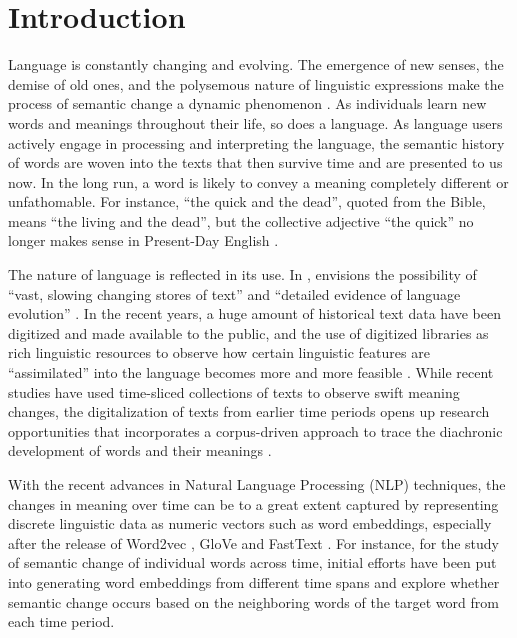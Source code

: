 

\chapter{Introduction}
Language is constantly changing and evolving. The emergence of new senses, the demise of old ones, and the polysemous nature of linguistic expressions make the process of semantic change a dynamic phenomenon \parencite{robertinvanhove2008}. As individuals learn new words and meanings throughout their life, so does a language. As language users actively engage in processing and interpreting the language, the semantic history of words are woven into the texts that then survive time and are presented to us now. In the long run, a word is likely to convey a meaning completely different or unfathomable. For instance, ``the quick and the dead'', quoted from the Bible, means ``the living and the dead'', but the collective adjective ``the quick'' no longer makes sense in Present-Day English \parencite[199]{semanticincrowley2010}.

The nature of language is reflected in its use. In \citeyear{sinclair1982reflections}, \citeauthor{sinclair1982reflections} envisions the possibility of ``vast, slowing changing stores of text'' and ``detailed evidence of language evolution'' . In the recent years, a huge amount of historical text data have been digitized and made available to the public, and the use of digitized libraries as rich linguistic resources to observe how certain linguistic features are ``assimilated'' into the language becomes more and more feasible \parencite{renouf2002time}. While recent studies have used time-sliced collections of texts to observe swift meaning changes, the digitalization of texts from earlier time periods opens up research opportunities that incorporates a corpus-driven approach to trace the diachronic development of words and their meanings \parencite{kutuzov2018survey,tahmasebi2018survey,camacho2018survey}.

With the recent advances in Natural Language Processing (NLP) techniques, the changes in meaning over time can be to a great extent captured by representing discrete linguistic data as numeric vectors such as word embeddings, especially after the release of Word2vec \parencite{mikolov2013efficient}, GloVe \parencite{pennington2014glove} and FastText \parencite{bojanowski2016enriching}. For instance, for the study of semantic change of individual words across time, initial efforts have been put into generating word embeddings from different time spans and explore whether semantic change occurs based on the neighboring words of the target word from each time period.


